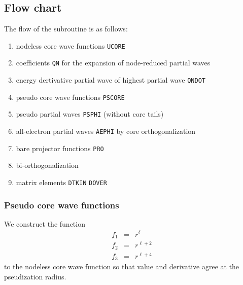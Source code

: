 \documentclass[11pt,a4paper]{report}
\begin{document}
\subsection{Flow chart}
The flow of the subroutine is as follows:
\begin{enumerate}
\item nodeless core wave functions \verb|UCORE|
\item coefficients \verb|QN| for the expansion of node-reduced partial waves 
\item energy dertivative partial wave of highest partial wave \verb|QNDOT|
\item pseudo core wave functions \verb|PSCORE|
\item pseudo partial waves \verb|PSPHI| (without core tails)
\item all-electron partial waves \verb|AEPHI| by core orthogonalization
\item bare projector functions \verb|PRO|
\item bi-orthogonalization
\item matrix elements \verb|DTKIN| \verb|DOVER|
\end{enumerate}

\subsubsection{Pseudo core wave functions}
We construct the function
\begin{eqnarray}
f_1&=&r^\ell
\nonumber\\
f_2&=& r^{\ell+2}
\nonumber\\
f_3&=& r^{\ell+4}
\end{eqnarray}
to the nodeless core wave function so that value and derivative agree
at the pseudization radius.

\appendix
\end{document}
